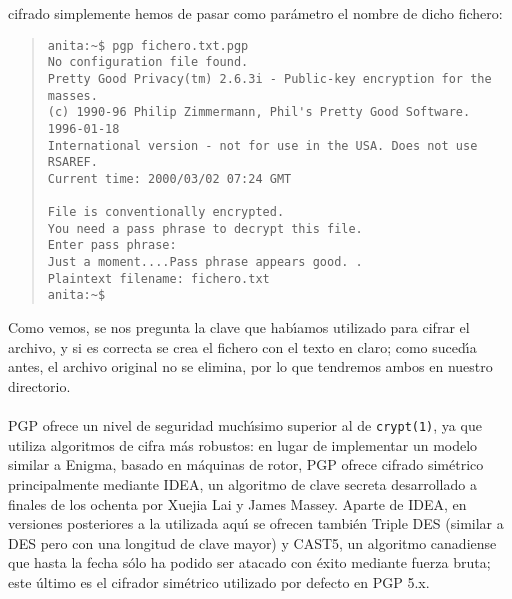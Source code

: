 cifrado simplemente hemos de pasar como par\'ametro el nombre de dicho fichero:
\begin{quote}
\begin{verbatim}
anita:~$ pgp fichero.txt.pgp 
No configuration file found.
Pretty Good Privacy(tm) 2.6.3i - Public-key encryption for the masses.
(c) 1990-96 Philip Zimmermann, Phil's Pretty Good Software. 1996-01-18
International version - not for use in the USA. Does not use RSAREF.
Current time: 2000/03/02 07:24 GMT

File is conventionally encrypted.  
You need a pass phrase to decrypt this file. 
Enter pass phrase: 
Just a moment....Pass phrase appears good. .
Plaintext filename: fichero.txt
anita:~$ 
\end{verbatim}
\end{quote}
Como vemos, se nos pregunta la clave que hab\'{\i}amos utilizado para cifrar
el archivo, y si es correcta se crea el fichero con el texto en claro; como
suced\'{\i}a antes, el archivo original no se elimina, por lo que tendremos
ambos en nuestro directorio.\\
\\PGP ofrece un nivel de seguridad much\'{\i}simo superior al de {\tt crypt(1)},
ya que utiliza algoritmos de cifra m\'as robustos: en lugar de implementar un
modelo similar a Enigma, basado en m\'aquinas de rotor, PGP ofrece cifrado
sim\'etrico principalmente mediante IDEA, un algoritmo de clave secreta 
desarrollado a finales de los ochenta por Xuejia Lai y James Massey. Aparte de
IDEA, en versiones posteriores a la utilizada aqu\'{\i} se ofrecen tambi\'en
Triple DES (similar a DES pero con una longitud de clave mayor) y CAST5, un 
algoritmo canadiense que hasta la fecha s\'olo ha podido ser atacado con 
\'exito mediante fuerza bruta; este \'ultimo es el cifrador sim\'etrico 
utilizado por defecto en PGP 5.x.
